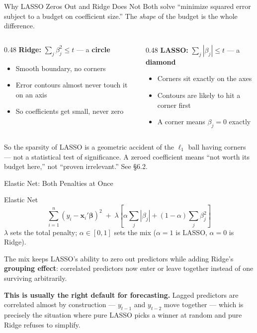 \documentclass[aspectratio=169, 11pt]{beamer}
\begin{document}
\begin{frame}{Why LASSO Zeros Out and Ridge Does Not}
  Both solve ``minimize squared error subject to a budget on coefficient size.'' The
  \emph{shape} of the budget is the whole difference.
  \begin{columns}[T]
    \begin{column}{0.48\textwidth}
      \textbf{Ridge:} $\sum_j \beta_j^2 \le t$ --- a \textbf{circle}
      \begin{itemize}\small\itemsep0pt
        \item Smooth boundary, no corners
        \item Error contours almost never touch it on an axis
        \item So coefficients get small, never zero
      \end{itemize}
    \end{column}
    \begin{column}{0.48\textwidth}
      \textbf{LASSO:} $\sum_j |\beta_j| \le t$ --- a \textbf{diamond}
      \begin{itemize}\small\itemsep0pt
        \item Corners sit exactly on the axes
        \item Contours are likely to hit a corner first
        \item A corner means $\beta_j = 0$ exactly
      \end{itemize}
    \end{column}
  \end{columns}

  \vspace{0.2cm}
  So the sparsity of LASSO is a geometric accident of the $\ell_1$ ball having corners --- not
  a statistical test of significance. A zeroed coefficient means ``not worth its budget
  here,'' not ``proven irrelevant.'' See \textcite{James2021} \S6.2.
\end{frame}

\begin{frame}{Elastic Net: Both Penalties at Once}
  \begin{definitionbox}{Elastic Net \parencite{ZouHastie2005}}
    \[
      \sum_{i=1}^{n}(y_i - \mathbf{x}_i'\boldsymbol{\beta})^2
      \; + \; \lambda \left[ \alpha \sum_j |\beta_j|
      + (1-\alpha) \sum_j \beta_j^2 \right]
    \]
    $\lambda$ sets the total penalty; $\alpha \in [0,1]$ sets the mix ($\alpha=1$ is LASSO,
    $\alpha=0$ is Ridge).
  \end{definitionbox}
  The mix keeps LASSO's ability to zero out predictors while adding Ridge's \textbf{grouping
  effect}: correlated predictors now enter or leave together instead of one surviving
  arbitrarily.

  \vspace{0.15cm}
  \textbf{This is usually the right default for forecasting.} Lagged predictors are correlated
  almost by construction --- $y_{t-1}$ and $y_{t-2}$ move together --- which is precisely the
  situation where pure LASSO picks a winner at random and pure Ridge refuses to simplify.
\end{frame}
\end{document}
